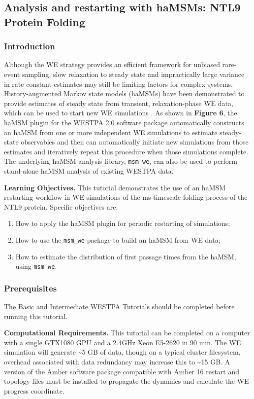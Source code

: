 \subsection{Analysis and restarting with haMSMs: NTL9 Protein Folding}

\subsubsection{Introduction}
Although the WE strategy provides an efficient framework for unbiased rare-event sampling, slow relaxation to steady state and impractically large variance in rate constant estimates may still be limiting factors for complex systems.
History-augmented Markov state models (haMSMs) have been demonstrated to provide estimates of steady state from transient, relaxation-phase WE data, which can be used to start new WE simulations \citep{copperman_accelerated_2020}. 
As shown in \textbf{Figure 6}, the haMSM plugin for the WESTPA 2.0 software package automatically constructs an haMSM from one or more independent WE simulations to estimate steady-state observables and then can automatically initiate new simulations from those estimates and iteratively repeat this procedure when those simulations complete. 
The underlying haMSM analysis library, \verb|msm_we|, can also be used to perform stand-alone haMSM analysis of existing WESTPA data.

\textbf{Learning Objectives.}  This tutorial demonstrates the use of an haMSM restarting workflow in WE simulations of the ms-timescale folding process of the NTL9 protein. 
Specific objectives are:
\begin{enumerate}
    \item How to apply the haMSM plugin for periodic restarting of simulations;
    \item How to use the \verb|msm_we| package to build an haMSM from WE data;
    \item How to estimate the distribution of first passage times from the haMSM, using \verb|msm_we|.
\end{enumerate}

\subsubsection{Prerequisites} The Basic and Intermediate WESTPA Tutorials \citep{bogetti_suite_2019} should be completed before running this tutorial.

\textbf{Computational Requirements.} This tutorial can be completed on a computer with a single GTX1080 GPU and a 2.4GHz Xeon E5-2620 in 90 min. 
The WE simulation will generate \textasciitilde5 GB of data, though on a typical cluster filesystem, overhead associated with data redundancy may increase this to \textasciitilde15 GB. 
A version of the Amber software package compatible with Amber 16 restart and topology files must be installed to propagate the dynamics and calculate the WE progress coordinate. 

